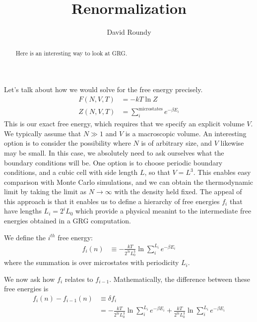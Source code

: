 \documentclass[letterpaper,twocolumn,amsmath,amssymb,pre,aps,10pt]{revtex4-1}
\begin{document}
\title{Renormalization}

\author{David Roundy}

\begin{abstract}
  Here is an interesting way to look at GRG.
\end{abstract}

\maketitle


Let's talk about how we would solve for the free energy precisely.
\begin{align}
  F(N, V, T) &= -kT\ln Z \\
  Z(N, V, T) &= \sum_{i}^{\text{microstates}} e^{-\beta E_i}
\end{align}
This is our exact free energy, which requires that we specify an
explicit volume $V$.  We typically assume that $N \gg 1$ and $V$ is a
macroscopic volume.  An interesting option is to consider the
possibility where $N$ is of arbitrary size, and $V$ likewise may be
small.  In this case, we absolutely need to ask ourselves what the
boundary conditions will be.  One option is to choose periodic
boundary conditions, and a cubic cell with side length $L$, so that $V
= L^3$.  This enables easy comparison with Monte Carlo simulations,
and we can obtain the thermodynamic limit by taking the limit as
$N\rightarrow \infty$ with the density held fixed.  The appeal of this
approach is that it enables us to define a hierarchy of free energies
$f_i$ that have lengths $L_i=2^i L_0$ which provide a physical meanint
to the intermediate free energies obtained in a GRG computation.

We define the $i^{th}$ free energy:
\begin{align}
  f_i(n) &\equiv -\frac{kT}{2^{3i}L_0^3}\ln \sum_{i}^{L_i} e^{-\beta E_i}
\end{align}
where the summation is over microstates with periodicity $L_i$.

We now ask how $f_i$ relates to $f_{i-1}$.  Mathematically, the
difference between these free energies is
\begin{align}
  f_i(n) - f_{i-1}(n) &\equiv \delta f_i \\
  &= -\frac{kT}{2^{3i}L_0^3}\ln \sum_{i}^{L_i} e^{-\beta E_i}
  +\frac{kT}{2^{3i}L_0^3}\ln \sum_{i}^{L_i} e^{-\beta E_i}
\end{align}
\end{document}
